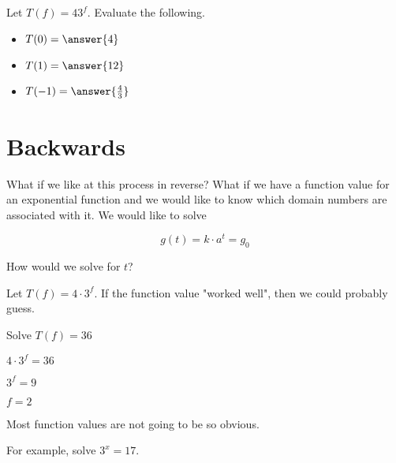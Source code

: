 \documentclass{ximera}
\begin{document}
\begin{example}

Let $T(f) = 4 3^f$.  Evaluate the following.

\begin{itemize}
\item $T(0) = \answer{4}$ 
\item $T(1) = \answer{12}$
\item $T(-1) = \answer{\frac{4}{3}}$
\end{itemize}
\end{example}























\section{Backwards}

What if we like at this process in reverse?  What if we have a function value for an exponential function and we would like to know which domain numbers are associated with it.  We would like to solve


\[    g(t) = k \cdot a^t  =   g_0    \]


How would we solve for $t$?






\begin{example}

Let $T(f) = 4 \cdot 3^f$.  If the function value "worked well", then we could probably guess.


Solve $T(f) = 36$

$4 \cdot 3^f = 36$

$3^f = 9$

$f = 2$

\end{example}









Most function values are not going to be so obvious. 


For example, solve $ 3^x = 17$.
\end{document}
